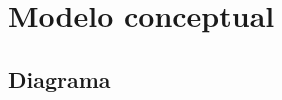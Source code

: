 \documentclass[a4paper, 10pt, twoside]{article}
\newcounter{usecasecounter}
\newcounter{usecasealtcounter}
\newcounter{nroCU}
\newcommand{\ucname}[1]{\renewcommand{\givenucname}{#1}}
\newcommand{\ucpre}[1]{\renewcommand{\givenucpre}{#1}}
\newcommand{\ucpost}[1]{\renewcommand{\givenucpost}{#1}}
\newcommand{\ucactor}[1]{\renewcommand{\givenucactor}{#1}}
\newcommand{\givenucname}{REQUIRED!}
\newcommand{\givenucpre}{REQUIRED!}
\newcommand{\givenucpost}{REQUIRED!}
\newcommand{\givenucactor}{REQUIRED!}
\newenvironment{usecase}
  {}{
    \stepcounter{nroCU}
    \textbf{Caso de uso \arabic{nroCU}: }\givenucname \\
    \textbf{Pre: }\givenucpre \\
    \textbf{Post: }\givenucpost \\
    \textbf{Actores: }\givenucactor
  }
\newenvironment{usecasesteps}
  {
    \setcounter{usecasecounter}{0}
    \setcounter{usecasealtcounter}{0}

    \tabularx{\textwidth}{|l|X|}
    \hline
    Curso normal & Curso alternativo \\
    \hline
    \hline
  }{
    \endtabularx
    \vspace{\parskip}
  }
\newcommand{\ucstep}[2]{
  \stepcounter{usecasecounter}%
  \parbox[t]{7.5cm}{
    \makebox[2ex][l]{\arabic{usecasecounter}.}
    #1\phantom{p}
  }
  &
  \parbox[t]{7.5cm}{
    \setcounter{usecasealtcounter}{0}
    #2\phantom{p}
  } \\
  \hline
}
\begin{document}





\section{Modelo conceptual}


\subsection{Diagrama}
\end{document}
